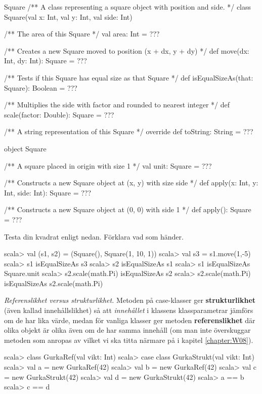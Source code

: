 \begin{ScalaSpec}{Square}
/** A class representing a square object with position and side. */
class Square(val x: Int, val y: Int, val side: Int) {
  /** The area of this Square */
  val area: Int = ???

  /** Creates a new Square moved to position (x + dx, y + dy) */
  def move(dx: Int, dy: Int): Square = ???

  /** Tests if this Square has equal size as that Square */
  def isEqualSizeAs(that: Square): Boolean = ???

  /** Multiplies the side with factor and rounded to nearest integer */
  def scale(factor: Double): Square = ???

  /** A string representation of this Square */
  override def toString: String = ???
}

object Square {
  /** A square placed in origin with size 1 */
  val unit: Square = ???

  /** Constructs a new Square object at (x, y) with size side */
  def apply(x: Int, y: Int, side: Int): Square = ???

  /** Constructs a new Square object at (0, 0) with side 1 */
  def apply(): Square = ???
}
\end{ScalaSpec}

\Subtask Testa din kvadrat enligt nedan. Förklara vad som händer.

\begin{REPL}
scala> val (s1, s2) = (Square(), Square(1, 10, 1))
scala> val s3 = s1.move(1,-5)
scala> s1 isEqualSizeAs s3
scala> s2 isEqualSizeAs s1
scala> s1 isEqualSizeAs Square.unit
scala> s2.scale(math.Pi) isEqualSizeAs s2
scala> s2.scale(math.Pi) isEqualSizeAs s2.scale(math.Pi)
\end{REPL}

\Task \emph{Referenslikhet versus strukturlikhet.} Metoden \code{==} på case-klasser ger \textbf{strukturlikhet} (även kallad innehållslikhet) så att \emph{innehållet} i klassens klassparametrar jämförs om de har lika värde, medan för vanliga klasser ger metoden \code{==} \textbf{referenslikhet} där olika objekt är olika även om de har samma innehåll (om man inte överskuggar metoden  som anropas av \code{==} vilket vi ska titta närmare på i kapitel \ref{chapter:W08}).

\begin{REPL}
scala> class GurkaRef(val vikt: Int)
scala> case class GurkaStrukt(val vikt: Int)
scala> val a = new GurkaRef(42)
scala> val b = new GurkaRef(42)
scala> val c = new GurkaStrukt(42)
scala> val d = new GurkaStrukt(42)
scala> a == b
scala> c == d
\end{REPL}

